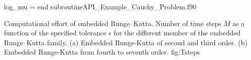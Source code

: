       \vspace{0.5cm} 
                {log_mu =}
                {end subroutine}{API_Example_Cauchy_Problem.f90}
 
          
     \twographs{}
               {}
               {Computational effort of embedded Runge--Kutta. Number of time steps $ M $ as a function of the specified tolerance 
                $ \epsilon $ for the different member of the embedded Runge--Kutta family.
                  (a) Embedded Runge-Kutta of second and third order.
                  (b) Embedded Runge-Kutta from fourth to seventh order. }
                  {fig:Tsteps}                       
 
           
           
